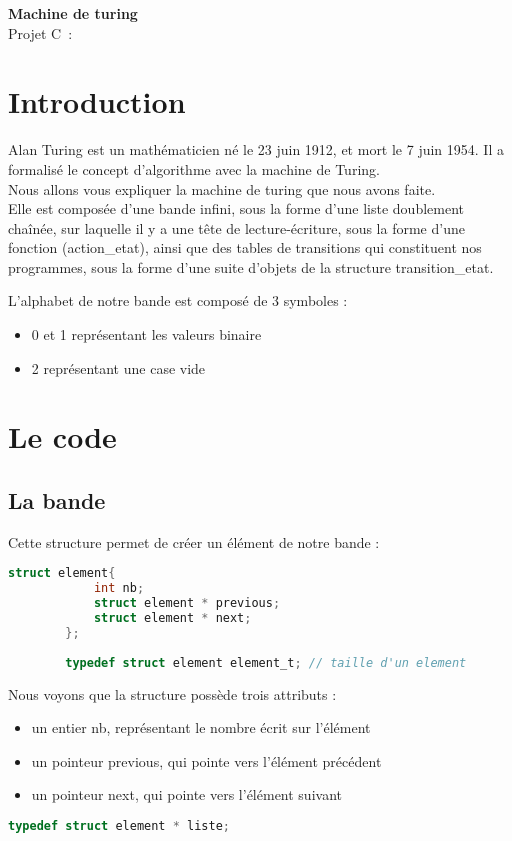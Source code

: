 \documentclass[a4paper,10pt]{article}
\begin{document}
\begin{center}
{\Large\bf
Machine de turing\\}
Projet C~: 
\end{center}


\section{Introduction}

    Alan Turing est un mathématicien né le 23 juin 1912, et mort le 7 juin 1954. Il a formalisé le concept d'algorithme avec la machine de Turing.
    \\[1 em]
    Nous allons vous expliquer la machine de turing que nous avons faite. 
    \\[1 em]
    Elle est composée d'une bande infini, sous la forme d'une liste doublement chaînée, sur laquelle il y a une tête de lecture-écriture, sous la forme d'une fonction (action\_etat), ainsi que des tables de transitions qui constituent nos programmes, sous la forme d'une suite d'objets de la structure transition\_etat.
    
    L'alphabet de notre bande est composé de 3 symboles : 
    \begin{itemize}
    \item 0 et 1 représentant les valeurs binaire
    \item 2 représentant une case vide
    \end{itemize}
    
\section{Le code}
    \subsection{La bande}
        Cette structure permet de créer un élément de notre bande :
        \begin{lstlisting}[language=c]
        struct element{ 
        	int nb;
        	struct element * previous;
        	struct element * next;
        };
        
        typedef struct element element_t; // taille d'un element 
        \end{lstlisting}
        
        Nous voyons que la structure possède trois attributs : 
        
        \begin{itemize}
        \item un entier nb, représentant le nombre écrit sur l'élément
        \item un pointeur previous, qui pointe vers l'élément précédent
        \item un pointeur next, qui pointe vers l'élément suivant
        \end{itemize}
        \begin{lstlisting}[language=c]
        typedef struct element * liste;
        \end{lstlisting}
        
\end{document}
